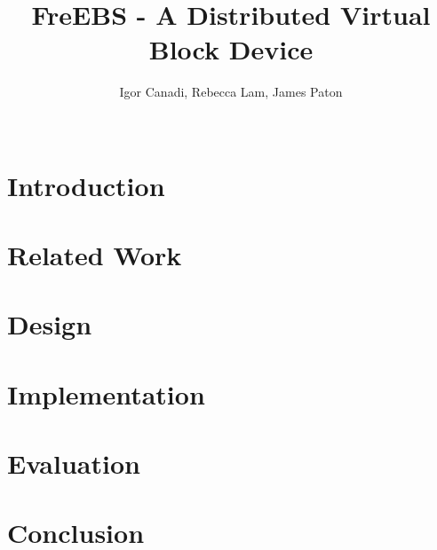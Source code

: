 \documentclass{sig-alternate-10pt}
\begin{document}
\title{FreEBS - A Distributed Virtual Block Device}

\author{
	\alignauthor Igor Canadi, Rebecca Lam, James Paton\\
	\\
}

\maketitle



\section{Introduction}
\label{sec:intro}


\section{Related Work}
\label{sec:related}


\section{Design}
\label{sec:design}


\section{Implementation}
\label{sec:implementation}


\section{Evaluation}
\label{sec:evaluation}


\section{Conclusion}
\label{sec:conc}




\end{document}
